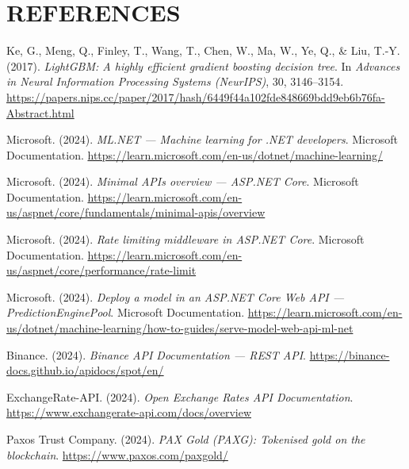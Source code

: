 \section*{REFERENCES}

\begin{enumerate}[label={[\arabic*]}, leftmargin=1.5cm]

  \item \label{ref:lightgbm}
  Ke, G., Meng, Q., Finley, T., Wang, T., Chen, W., Ma, W., Ye, Q., \& Liu, T.-Y. (2017).
  \textit{LightGBM: A highly efficient gradient boosting decision tree}.
  In \textit{Advances in Neural Information Processing Systems (NeurIPS)}, 30, 3146--3154.
  \url{https://papers.nips.cc/paper/2017/hash/6449f44a102fde848669bdd9eb6b76fa-Abstract.html}

  \item \label{ref:mlnet}
  Microsoft. (2024).
  \textit{ML.NET --- Machine learning for .NET developers}.
  Microsoft Documentation.
  \url{https://learn.microsoft.com/en-us/dotnet/machine-learning/}

  \item \label{ref:aspnet}
  Microsoft. (2024).
  \textit{Minimal APIs overview --- ASP.NET Core}.
  Microsoft Documentation.
  \url{https://learn.microsoft.com/en-us/aspnet/core/fundamentals/minimal-apis/overview}

  \item \label{ref:ratelimiting}
  Microsoft. (2024).
  \textit{Rate limiting middleware in ASP.NET Core}.
  Microsoft Documentation.
  \url{https://learn.microsoft.com/en-us/aspnet/core/performance/rate-limit}

  \item \label{ref:predictionpool}
  Microsoft. (2024).
  \textit{Deploy a model in an ASP.NET Core Web API --- PredictionEnginePool}.
  Microsoft Documentation.
  \url{https://learn.microsoft.com/en-us/dotnet/machine-learning/how-to-guides/serve-model-web-api-ml-net}

  \item \label{ref:binance}
  Binance. (2024).
  \textit{Binance API Documentation --- REST API}.
  \url{https://binance-docs.github.io/apidocs/spot/en/}

  \item \label{ref:exchangerate}
  ExchangeRate-API. (2024).
  \textit{Open Exchange Rates API Documentation}.
  \url{https://www.exchangerate-api.com/docs/overview}

  \item \label{ref:paxg}
  Paxos Trust Company. (2024).
  \textit{PAX Gold (PAXG): Tokenised gold on the blockchain}.
  \url{https://www.paxos.com/paxgold/}


\end{enumerate}
